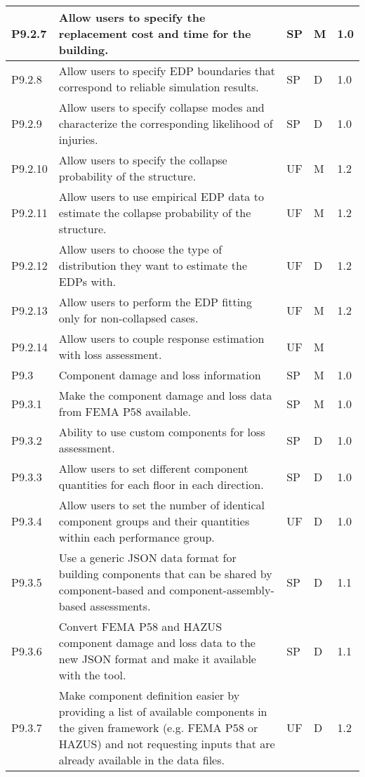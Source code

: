 \begin{longtable}{| p{} | p{} | p{} | p{} |  p{} |}
P9.2.7 &  Allow users to specify the replacement cost and time for the building. & SP & M & 1.0 \\ \hline
P9.2.8 &  Allow users to specify EDP boundaries that correspond to reliable simulation results. & SP & D & 1.0\\ \hline
P9.2.9 & Allow users to specify collapse modes and characterize the corresponding likelihood of injuries. & SP & D & 1.0\\ \hline
P9.2.10 & Allow users to specify the collapse probability of the structure. & UF & M & 1.2\\ \hline
P9.2.11 & Allow users to use empirical EDP data to estimate the collapse probability of the structure. & UF & M & 1.2\\ \hline
P9.2.12 & Allow users to choose the type of distribution they want to estimate the EDPs with. & UF & D & 1.2\\ \hline
P9.2.13 & Allow users to perform the EDP fitting only for non-collapsed cases. & UF & M & 1.2\\ \hline
P9.2.14 & Allow users to couple response estimation with loss assessment. & UF & M & \\ \hline
P9.3 & Component damage and loss information & SP & M & 1.0\\ \hline
P9.3.1 & Make the component damage and loss data from FEMA P58 available. & SP & M & 1.0 \\ \hline
P9.3.2 & Ability to use custom components for loss assessment. & SP & D & 1.0 \\ \hline
P9.3.3 & Allow users to set different component quantities for each floor in each direction. & SP & D & 1.0 \\ \hline
P9.3.4 & Allow users to set the number of identical component groups and their quantities within each performance group. & UF & D & 1.0 \\ \hline
P9.3.5 & Use a generic JSON data format for building components that can be shared by component-based and component-assembly-based assessments. & SP & D & 1.1 \\ \hline
P9.3.6 & Convert FEMA P58 and HAZUS component damage and loss data to the new JSON format and make it available with the tool. & SP & D & 1.1 \\ \hline
P9.3.7 & Make component definition easier by providing a list of available components in the given framework (e.g. FEMA P58 or HAZUS) and not requesting inputs that are already available in the data files. & UF & D & 1.2 \\ \hline

\end{longtable}
